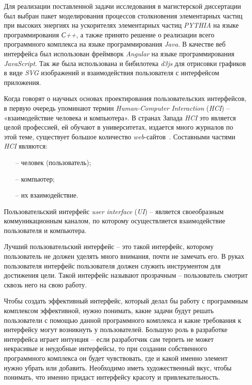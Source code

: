 Для реализации поставленной задачи исследования в магистерской
диссертации был выбран пакет моделирования процессов столкновения элементарных частиц при высоких энергиях на ускорителях элементарных частиц \textit{PYTHIA} на языке программирования \textit{С++}, а также принято решение о реализации всего программного
комплекса на языке программирования \textit{Java}.
В качестве веб интерфейса был использован фреймворк \textit{Angular} на языке программирования \textit{JavaScript}. Так же была использована и бибилотека \textit{d3js} для отрисовки графиков в виде \textit{SVG} изображений и взаимодействия пользователя с интерфейсом приложения.

Когда говорят о научных основах проектирования пользовательских
интерфейсов, в первую очередь упоминают термин \textit{Human-Computer Interaction}
(\textit{HCI}) – «взаимодействие человека и компьютера». В странах Запада \textit{HCI} это
является целой профессией, ей обучают в университетах, издается много
журналов по этой теме, существует большое количество \textit{web}-сайтов~\cite{user-interface}.
Составными частями \textit{HCI} являются:

\begin{enumerate}
	\item[--] человек (пользователь);
	\item[--] компьютер;
	\item[--] их взаимодействие.
\end{enumerate}

Пользовательский интерфейс \textit{user interface} (\textit{UI}) – является своеобразным
коммуникационным каналом, по которому осуществляется взаимодействие
пользователя и компьютера.

Лучший пользовательский интерфейс – это такой интерфейс, которому
пользователь не должен уделять много внимания, почти не замечать его. В руках
пользователя интерфейс пользователя должен служить инструментом для
достижения цели. Такой интерфейс называют прозрачным – пользователь
смотрит сквозь него на свою работу.

Чтобы создать эффективный интерфейс, который делал бы работу с
программным комплексом эффективной, нужно понимать, какие задачи будут
решать пользователи с помощью данной программного комплекса и какие
требования к интерфейсу могут возникнуть у пользователей. Большую роль в
разработке интерфейса играет интуиция – если разработчик сам терпеть не
может некрасивые и неудобные интерфейсы, то при создании собственного
программного комплекса он будет чувствовать, где и какой именно элемент
нужно убрать или добавить. Необходимо иметь художественный вкус, чтобы
понимать, что именно придаст интерфейсу красоту и привлекательность.

